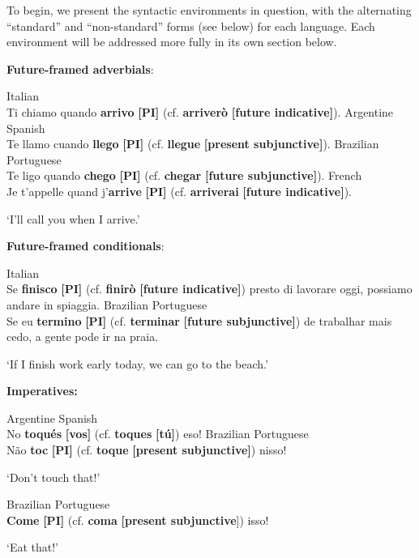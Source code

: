\documentclass[output=paper,colorlinks,citecolor=brown]{langscibook}
\begin{document}
To begin, we present the syntactic environments in question, with the alternating ``standard'' and ``non-standard'' forms (see below) for each language. Each environment will be addressed more fully in its own section below.

\begin{exe}
\ex\label{ex:hoff:ffaexamples} \textbf{Future-framed adverbials}: \\ 
	\ex
	\begin{xlist}
\ex Italian\\Ti chiamo quando \textbf{arrivo} \textbf{[PI]} (cf. \textbf{arriverò} \textbf{[future indicative]}).
\ex Argentine Spanish\\Te llamo cuando \textbf{llego} \textbf{[PI]} (cf. \textbf{llegue} \textbf{[present subjunctive]}).
\ex Brazilian Portuguese\\Te ligo quando \textbf{chego} \textbf{[PI]} (cf. \textbf{chegar} \textbf{[future subjunctive]}).
\ex French\\Je t’appelle quand j’\textbf{arrive} \textbf{[PI]} (cf. \textbf{arriverai} \textbf{[future indicative]}).
\end{xlist}
`I'll call you when I arrive.'
\end{exe}

\begin{exe}
\ex\label{ex:hoff:ffcexamples} \textbf{Future-framed conditionals}: \\ 
	\ex
	\begin{xlist}
\ex Italian\\Se \textbf{finisco} \textbf{[PI]} (cf. \textbf{finirò} \textbf{[future indicative]}) presto di lavorare oggi, possiamo andare in spiaggia.
\ex Brazilian Portuguese\\Se eu \textbf{termino} \textbf{[PI]} (cf. \textbf{terminar} \textbf{[future subjunctive]}) de trabalhar mais cedo, a gente pode ir na praia.
\end{xlist}
`If I finish work early today, we can go to the beach.'
\end{exe}

\begin{exe}
\ex\label{ex:hoff:Imperativeexamples} \textbf{Imperatives:} \\ 
	\ex
	\begin{xlist}
\ex Argentine Spanish\\No \textbf{toqués} \textbf{[vos]} (cf. \textbf{toques} \textbf{[tú]}) eso! 
\ex Brazilian Portuguese\\Não \textbf{toc} \textbf{[PI]} (cf. \textbf{toque} \textbf{[present subjunctive]}) nisso!
\end{xlist}
`Don’t touch that!'
\begin{xlist}
\ex Brazilian Portuguese\\\textbf{Come} \textbf{[PI]} (cf. \textbf{coma} \textbf{[present subjunctive}]) isso!
\end{xlist}
`Eat that!'
\end{exe}
\end{document}
